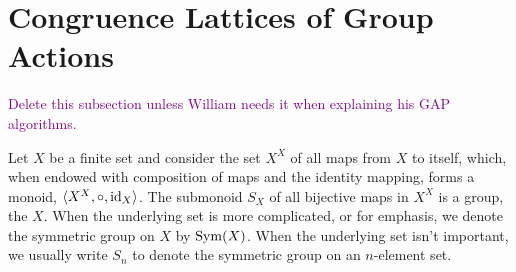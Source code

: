\begin{comment}

\end{comment}


\section{Congruence Lattices of Group Actions}
\label{sec:congr-latt-group}

\textcolor{purple}{Delete this subsection unless William needs it when explaining
his GAP algorithms.}

Let $X$ be a finite set and consider the set $X^X$ of all maps from $X$ to
itself, which, when endowed with composition of maps and the identity mapping,
forms a monoid, $\langle X^X, \circ, \operatorname{id}_X\rangle$.  The submonoid $S_X$ of all bijective
maps in $X^X$ is a group, the  $X$.  When the
underlying set is more complicated, or for emphasis, we denote the symmetric
group on $X$ by $\operatorname{Sym}(X)$.  When the  
underlying set isn't important, we usually write $S_n$ to denote the
symmetric group on an $n$-element set. 





